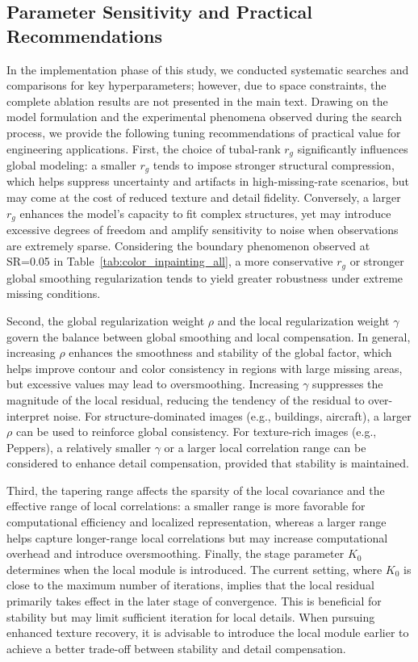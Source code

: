 \documentclass[a4paper,12pt]{article}
\numberwithin{equation}{section}
\numberwithin{algorithm}{section}
\theoremstyle{remark}
\theoremstyle{definition}
\begin{document}
\subsection{Parameter Sensitivity and Practical Recommendations}  
In the implementation phase of this study, we conducted systematic searches and comparisons for key hyperparameters; however, due to space constraints, the complete ablation results are not presented in the main text. Drawing on the model formulation and the experimental phenomena observed during the search process, we provide the following tuning recommendations of practical value for engineering applications. First, the choice of tubal-rank $r_g$ significantly influences global modeling: a smaller $r_g$ tends to impose stronger structural compression, which helps suppress uncertainty and artifacts in high-missing-rate scenarios, but may come at the cost of reduced texture and detail fidelity. Conversely, a larger $r_g$ enhances the model’s capacity to fit complex structures, yet may introduce excessive degrees of freedom and amplify sensitivity to noise when observations are extremely sparse. Considering the boundary phenomenon observed at SR=0.05 in Table~\ref{tab:color_inpainting_all}, a more conservative $r_g$ or stronger global smoothing regularization tends to yield greater robustness under extreme missing conditions.

Second, the global regularization weight $\rho$ and the local regularization weight $\gamma$ govern the balance between global smoothing and local compensation. In general, increasing $\rho$ enhances the smoothness and stability of the global factor, which helps improve contour and color consistency in regions with large missing areas, but excessive values may lead to oversmoothing. Increasing $\gamma$ suppresses the magnitude of the local residual, reducing the tendency of the residual to over-interpret noise. For structure-dominated images (e.g., buildings, aircraft), a larger $\rho$ can be used to reinforce global consistency. For texture-rich images (e.g., Peppers), a relatively smaller $\gamma$ or a larger local correlation range can be considered to enhance detail compensation, provided that stability is maintained.

Third, the tapering range affects the sparsity of the local covariance and the effective range of local correlations: a smaller range is more favorable for computational efficiency and localized representation, whereas a larger range helps capture longer-range local correlations but may increase computational overhead and introduce oversmoothing. Finally, the stage parameter $K_0$ determines when the local module is introduced. The current setting, where $K_0$ is close to the maximum number of iterations, implies that the local residual primarily takes effect in the later stage of convergence. This is beneficial for stability but may limit sufficient iteration for local details. When pursuing enhanced texture recovery, it is advisable to introduce the local module earlier to achieve a better trade-off between stability and detail compensation.
\end{document}
